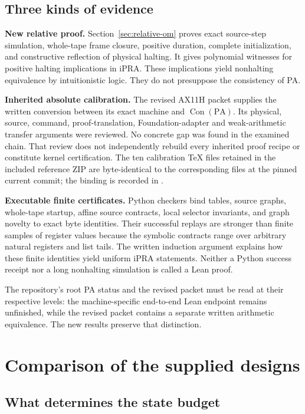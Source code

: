 \documentclass[11pt,a4paper]{article}
\newcommand{\PA}{\mathrm{PA}}
\newcommand{\Con}{\operatorname{Con}}
\begin{document}
\subsection{Three kinds of evidence}

\textbf{New relative proof.} Section~\ref{sec:relative-om} proves exact
source-step simulation, whole-tape frame closure, positive duration,
complete initialization, and constructive reflection of physical halting.
It gives polynomial witnesses for positive halting implications in iPRA.
These implications yield nonhalting equivalence by intuitionistic logic.
They do not presuppose the consistency of PA.

\textbf{Inherited absolute calibration.} The revised AX11H packet supplies
the written conversion between its exact machine and $\Con(\PA)$.
Its physical, source, command, proof-translation, Foundation-adapter and
weak-arithmetic transfer arguments were reviewed. No concrete gap was
found in the examined chain. That review does not independently rebuild
every inherited proof recipe or constitute kernel certification.
The ten calibration TeX files retained in the included reference ZIP are
byte-identical to the corresponding files at the pinned current commit;
the binding is recorded in .

\textbf{Executable finite certificates.} Python checkers bind tables,
source graphs, whole-tape startup, affine source contracts, local selector
invariants, and graph novelty to exact byte identities. Their successful
replays are stronger than finite samples of register values because the
symbolic contracts range over arbitrary natural registers and list tails.
The written induction argument explains how these finite identities yield
uniform iPRA statements. Neither a Python success receipt nor a long
nonhalting simulation is called a Lean proof.

The repository's root PA status and the revised packet must be read at
their respective levels: the machine-specific end-to-end Lean endpoint
remains unfinished, while the revised packet contains a separate written
arithmetic equivalence. The new results preserve that distinction.

\section{Comparison of the supplied designs}


\subsection{What determines the state budget}
\end{document}
